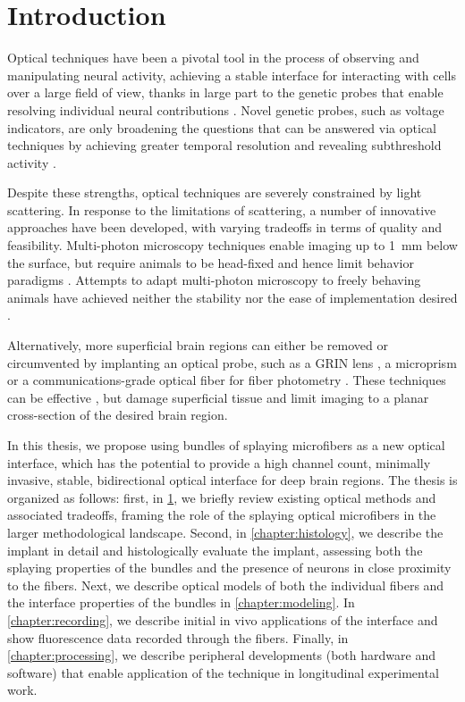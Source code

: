 \chapter{Introduction}
\label{chapter:intro}

\thispagestyle{myheadings}


Optical techniques have been a pivotal tool in the 
process of observing and manipulating neural activity, 
achieving a stable interface for interacting with cells 
over a large field of view, thanks in large part to the 
genetic probes that enable resolving individual 
neural contributions \cite{Emiliani:2015jl}. 
Novel genetic probes, such as voltage 
indicators, are only broadening the questions that can 
be answered via optical techniques by achieving 
greater temporal resolution and revealing subthreshold 
activity \cite{Gong:2015is}.

Despite these strengths, optical techniques are severely 
constrained by light scattering. In response to the 
limitations of scattering, a number of innovative approaches 
have been developed, with varying tradeoffs in terms of quality 
and feasibility. Multi-photon microscopy techniques enable 
imaging up to 1~mm below the surface, but require animals to 
be head-fixed and hence limit behavior paradigms 
\cite{Horton:2013gxa}. Attempts to adapt multi-photon microscopy 
to freely behaving animals have achieved neither the 
stability nor the ease of implementation desired 
\cite{Helmchen:2001tw,Flusberg:2005tq}.

Alternatively, more superficial brain regions can either 
be removed \cite{Dombeck:2010jr} or circumvented 
by implanting an optical probe, such as a GRIN lens 
\cite{Barretto:2009hk}, a microprism \cite{Andermann:2013kc}
or a communications-grade optical fiber for fiber 
photometry \cite{Guo:2015gu}. These techniques can be 
effective \cite{Betley:2015cn}, but damage superficial 
tissue and limit imaging to a planar cross-section 
of the desired brain region. 

In this thesis, we propose using bundles of splaying 
microfibers as a new optical interface, which has the 
potential to provide a high channel count, minimally 
invasive, stable, bidirectional optical interface for 
deep brain regions. The thesis is organized as follows: 
first, in \cref{chapter:intro}, we briefly review 
existing optical methods and associated tradeoffs, 
framing the role of the splaying optical microfibers in
the larger methodological landscape. Second, in 
\cref{chapter:histology}, we describe the implant in 
detail and histologically evaluate the implant, 
assessing both the splaying properties of the bundles
and the presence of neurons in close proximity to
the fibers. Next, we describe optical models of both 
the individual fibers and the interface properties of 
the bundles in \cref{chapter:modeling}. In 
\cref{chapter:recording}, we describe initial in vivo
applications of the interface and show fluorescence 
data recorded through the fibers. Finally, in
\cref{chapter:processing}, we describe peripheral 
developments (both hardware and software) that enable 
application of the technique in longitudinal 
experimental work.

